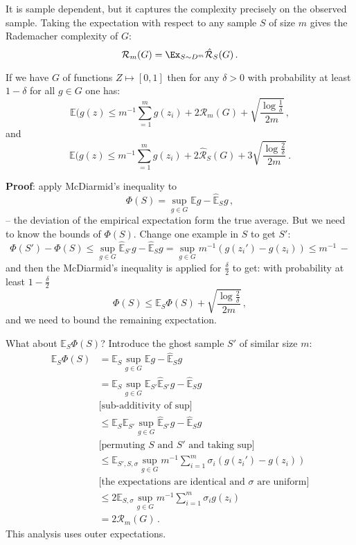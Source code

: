 \documentclass[a4paper]{article}
\newcommand{\ex}{\mathbb{E}}
\begin{document}
It is sample dependent, but it captures the complexity precisely on the observed
sample. Taking the expectation with respect to any sample $S$ of size $m$ gives
the Rademacher complexity of $G$:
\[ \mathcal{R}_m(G) = \Ex_{S\sim D^m} \hat{\mathcal{R}}_S(G) \,. \]

If we have $G$ of functions $Z\mapsto [0,1]$ then for any $\delta>0$ with probability
at least $1-\delta$ for all $g\in G$ one has:
\[ \ex (g(z)
	\leq m^{-1} \sum_{=1}^m g(z_i) + 2\mathcal{R}_m(G)
	+ \sqrt{\frac{\log\frac{1}{\delta}}{2m}}
	\,,\]
and
\[ \ex (g(z)
	\leq m^{-1} \sum_{=1}^m g(z_i) + 2\hat{\mathcal{R}}_S(G)
	+ 3\sqrt{\frac{\log\frac{2}{\delta}}{2m}}
	\,.\]

\textbf{Proof}: apply McDiarmid's inequality to
\[\Phi(S) = \sup_{g\in G} \ex g - \hat{\ex}_S g \,,\]
-- the deviation of the empirical expectation form the true average. But we need
to know the bounds of $\Phi(S)$.
Change one example in $S$ to get $S'$:
\[ \Phi(S') - \Phi(S)
	\leq \sup_{g\in G} \hat{\ex}_{S'} g  - \hat{\ex}_S g
	= \sup_{g\in G} m^{-1}(g(z_i')  - g(z_i))
	\leq m^{-1} \,- \]
and then the McDiarmid's inequality is applied for $\frac{\delta}{2}$ to get:
with probability at least $1-\frac{\delta}{2}$
\[ \Phi(S) \leq \ex_S \Phi(S) + \sqrt{\frac{\log\frac{2}{\delta}}{2m}} \,, \]
and we need to bound the remaining expectation.

What about $\ex_S \Phi(S)$? Introduce the ghost sample $S'$ of similar size $m$:
\begin{align}
	\ex_S \Phi(S)
		&= \ex_S \sup_{g\in G} \ex g - \hat{\ex}_S g \\
		&= \ex_S \sup_{g\in G} \ex_{S'} \hat{\ex}_{S'} g - \hat{\ex}_S g \\
		& \bigl[\text{sub-additivity of sup}\bigr]\\
		&\leq \ex_S \ex_{S'} \sup_{g\in G} \hat{\ex}_{S'} g - \hat{\ex}_S g \\
		& \bigl[\text{permuting } S \text{ and } S' \text{ and taking sup}\bigr] \\
		&\leq \ex_{S',S,\sigma} \sup_{g\in G} m^{-1} \sum_{i=1}^m \sigma_i(g(z_i') - g(z_i)) \\
		& \bigl[\text{the expectations are identical and } \sigma \text{ are uniform}\bigr] \\
		&\leq 2 \ex_{S,\sigma} \sup_{g\in G} m^{-1} \sum_{i=1}^m \sigma_i g(z_i) \\
		&= 2 \mathcal{R}_m(G) \,.
\end{align}
This analysis uses outer expectations.
\end{document}
